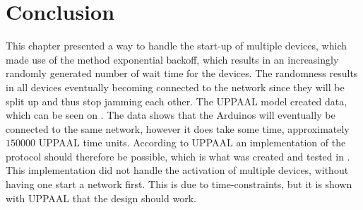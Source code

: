\section{Conclusion}
This chapter presented a way to handle the start-up of multiple devices, which made use of the method exponential backoff, which results in an increasingly randomly generated number of wait time for the devices. 
The randomness results in all devices eventually becoming connected to the network since they will be split up and thus stop jamming each other.
The UPPAAL model created data, which can be seen on .
The data shows that the Arduinos will eventually be connected to the same network, however it does take some time, approximately $150 000$ UPPAAL time units.
According to UPPAAL an implementation of the protocol should therefore be possible, which is what was created and tested in .
This implementation did not handle the activation of multiple devices, without having one start a network first. 
This is due to time-constraints, but it is shown with UPPAAL that the design should work.
